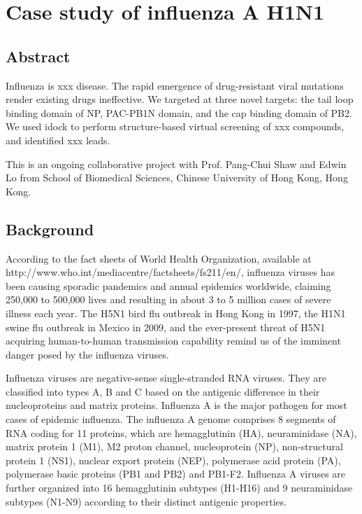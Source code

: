 \chapter{Case study of influenza A H1N1}
\label{influenza}

\section{Abstract}

Influenza is xxx disease. The rapid emergence of drug-resistant viral mutations render existing drugs ineffective. We targeted at three novel targets: the tail loop binding domain of NP, PAC-PB1N domain, and the cap binding domain of PB2. We used idock to perform structure-based virtual screening of xxx compounds, and identified xxx leads.

This is an ongoing collaborative project with Prof. Pang-Chui Shaw and Edwin Lo from School of Biomedical Sciences, Chinese University of Hong Kong, Hong Kong.

\section{Background}

According to the fact sheets of World Health Organization, available at http://www.who.int/mediacentre/factsheets/fs211/en/, influenza viruses has been causing sporadic pandemics and annual epidemics worldwide, claiming 250,000 to 500,000 lives and resulting in about 3 to 5 million cases of severe illness each year. The H5N1 bird flu outbreak in Hong Kong in 1997, the H1N1 swine flu outbreak in Mexico in 2009, and the ever-present threat of H5N1 acquiring human-to-human transmission capability remind us of the imminent danger posed by the influenza viruses. 

Influenza viruses are negative-sense single-stranded RNA viruses. They are classified into types A, B and C based on the antigenic difference in their nucleoproteins and matrix proteins. Influenza A is the major pathogen for most cases of epidemic influenza. The influenza A genome comprises 8 segments of RNA coding for 11 proteins, which are hemagglutinin (HA), neuraminidase (NA), matrix protein 1 (M1), M2 proton channel, nucleoprotein (NP), non-structural protein 1 (NS1), nuclear export protein (NEP), polymerase acid protein (PA), polymerase basic proteins (PB1 and PB2) and PB1-F2. Influenza A viruses are further organized into 16 hemagglutinin subtypes (H1-H16) and 9 neuraminidase subtypes (N1-N9) according to their distinct antigenic properties.

